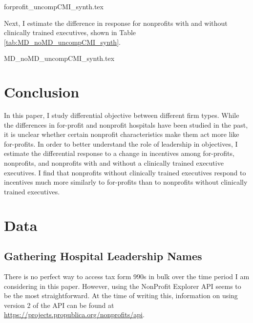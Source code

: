 \documentclass[12pt]{article}
\begin{document}
    {forprofit_uncompCMI_synth.tex}

    Next, I estimate the difference in response for nonprofits with and without clinically trained executives, shown in Table \ref{tab:MD_noMD_uncompCMI_synth}. 

    {MD_noMD_uncompCMI_synth.tex}

    \section{Conclusion}

    In this paper, I study differential objective between different firm types. While the differences in for-profit and nonprofit hospitals have been studied in the past, it is unclear whether certain nonprofit characteristics make them act more like for-profits. In order to better understand the role of leadership in objectives, I estimate the differential response to a change in incentives among for-profits, nonprofits, and nonprofits with and without a clinically trained executive executives. I find that nonprofits without clinically trained executives respond to incentives much more similarly to for-profits than to nonprofits without clinically trained executives.

	
	\newpage

    \printbibliography

\appendix

 \section{Data}\label{appendixdata}

\subsection{Gathering Hospital Leadership Names}

There is no perfect way to access tax form 990s in bulk over the time period I am considering in this paper. However, using the NonProfit Explorer API seems to be the most straightforward. At the time of writing this, information on using version 2 of the API can be found at \hyperlink{https://projects.propublica.org/nonprofits/api}{https://projects.propublica.org/nonprofits/api}. 
    
\end{document}
